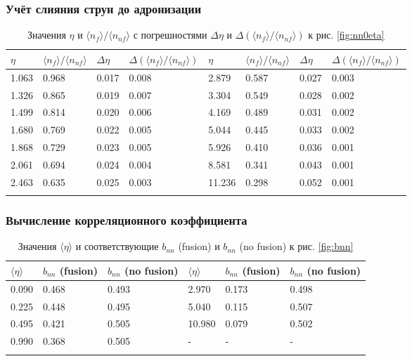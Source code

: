 \newpage
\subsubsection{Учёт слияния струн до адронизации}
{\footnotesize
\begin{longtable}{| l | l | l | l || l | l | l | l |}
	\hline
	$\eta$	&	$\langle n_{f} \rangle / \langle n_{nf} \rangle$	&	$\Delta \eta$	&	$\Delta (\langle n_{f} \rangle / \langle n_{nf} \rangle)$	&	$\eta$	&	$\langle n_{f} \rangle / \langle n_{nf} \rangle$	&	$\Delta \eta$	&	$\Delta (\langle n_{f} \rangle / \langle n_{nf} \rangle)$	\\
	\hline
	1.063	&	0.968	&	0.017	&	0.008	&	2.879	&	0.587	&	0.027	&	0.003	\\
	1.326	&	0.865	&	0.019	&	0.007	&	3.304	&	0.549	&	0.028	&	0.002	\\
	1.499	&	0.814	&	0.020	&	0.006	&	4.169	&	0.489	&	0.031	&	0.002	\\
	1.680	&	0.769	&	0.022	&	0.005	&	5.044	&	0.445	&	0.033	&	0.002	\\
	1.868	&	0.729	&	0.023	&	0.005	&	5.926	&	0.410	&	0.036	&	0.001	\\
	2.061	&	0.694	&	0.024	&	0.004	&	8.581	&	0.341	&	0.043	&	0.001	\\
	2.463	&	0.635	&	0.025	&	0.003	&	11.236	&	0.298	&	0.052	&	0.001	\\
	\hline
	\caption{Значения $\eta$ и $\langle n_{f} \rangle / \langle n_{nf} \rangle$ с погрешностями $\Delta \eta$ и $\Delta (\langle n_{f} \rangle / \langle n_{nf} \rangle)$ к рис. \ref{fig:nn0eta}} \label{tab:nn0eta}
\end{longtable}}

\subsubsection{Вычисление корреляционного коэффициента}
{\footnotesize
\begin{longtable}{| l | l | l || l | l | l |}
	\hline
	$\langle \eta \rangle$	&	$b_{nn}$ (fusion)	&	$b_{nn}$ (no fusion)	&	$\langle \eta \rangle$	&	$b_{nn}$ (fusion)	&	$b_{nn}$ (no fusion)	\\
	\hline
	0.090	&	0.468	&	0.493	&	2.970	&	0.173	&	0.498	\\
	0.225	&	0.448	&	0.495	&	5.040	&	0.115	&	0.507	\\
	0.495	&	0.421	&	0.505	&	10.980	&	0.079	&	0.502	\\
	0.990	&	0.368	&	0.505	&	-		&	-		&		-	\\
	\hline
	\caption{Значения $\langle \eta \rangle$ и соответствующие $b_{nn}$ (fusion) и $b_{nn}$ (no fusion) к рис. \ref{fig:bnn}} \label{tab:bnn}
\end{longtable}}

